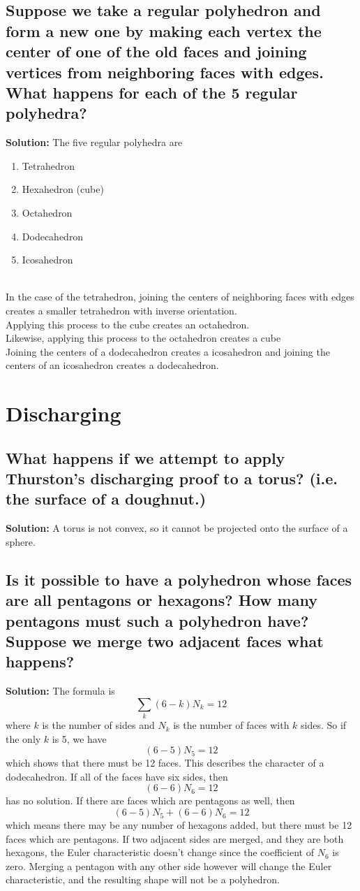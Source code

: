 \documentclass{article}
\newcommand{\exercise}[1]{\subsection{\normalfont #1}}
\newcommand{\solution}{\indent\indent \textbf{Solution: }}
\begin{document}
\exercise{Suppose we take a regular polyhedron and form a new one by making each vertex the center of one of the old faces and joining vertices from neighboring faces with edges. What happens for each of the 5 regular polyhedra?} %
\solution The five regular polyhedra are 
\begin{enumerate}
\item Tetrahedron
\item Hexahedron (cube)
\item Octahedron
\item Dodecahedron 
\item Icosahedron
\end{enumerate}
\quad \\
\indent In the case of the tetrahedron, joining the centers of neighboring faces with edges creates a smaller tetrahedron with inverse orientation. \\
\indent Applying this process to the cube creates an octahedron. \\
\indent Likewise, applying this process to the octahedron creates a cube \\
\indent Joining the centers of a dodecahedron creates a icosahedron and joining the centers of an icosahedron creates a dodecahedron.

\newpage
\section{Discharging}
\exercise{What happens if we attempt to apply Thurston's discharging proof to a torus? (i.e. the surface of a doughnut.)} %
\solution A torus is not convex, so it cannot be projected onto the surface of a sphere. 

\exercise{Is it possible to have a polyhedron whose faces are all pentagons or hexagons? How many pentagons must such a polyhedron have? Suppose we merge two adjacent faces what happens?} %
\solution The formula is 
$$\sum_k (6-k) N_k = 12$$
where $k$ is the number of sides and $N_k$ is the number of faces with $k$ sides. So if the only $k$ is 5, we have 
$$(6-5)N_5 = 12$$
which shows that there must be 12 faces. This describes the character of a dodecahedron. If all of the faces have six sides, then 
$$(6-6)N_6 = 12$$ 
has no solution. If there are faces which are pentagons as well, then
$$(6-5)N_5 + (6-6)N_6 = 12$$
which means there may be any number of hexagons added, but there must be 12 faces which are pentagons. If two adjacent sides are merged, and they are both hexagons, the Euler characteristic doesn't change since the coefficient of $N_6$ is zero. Merging a pentagon with any other side however will change the Euler characteristic, and the resulting shape will not be a polyhedron. 
\end{document}
